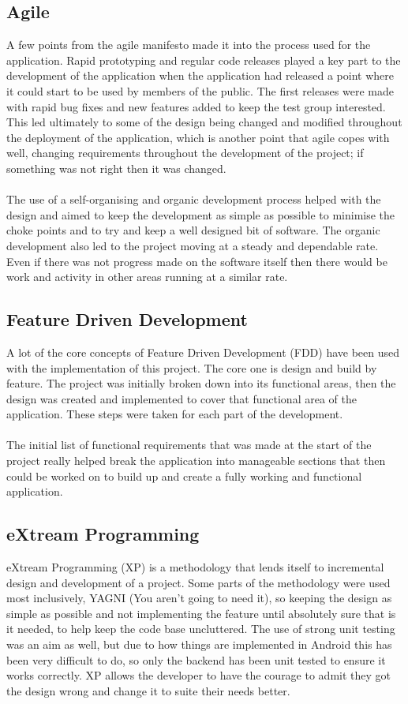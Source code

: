 \subsection{Agile}

A few points from the agile manifesto made it into the process used for the application. Rapid prototyping and regular code releases played a key part to the development of the application when the application had released a point where it could start to be used by members of the public. The first releases were made with rapid bug fixes and new features added to keep the test group interested. This led ultimately to some of the design being changed and modified throughout the deployment of the application, which is another point that agile copes with well, changing requirements throughout the development of the project; if something was not right then it was changed.\\
\\
The use of a self-organising and organic development process helped with the design and aimed to keep the development as simple as possible to minimise the choke points and to try and keep a well designed bit of software. The organic development also led to the project moving at a steady and dependable rate. Even if there was not progress made on the software itself then there would be work and activity in other areas running at a similar rate.

\subsection{Feature Driven Development}

A lot of the core concepts of Feature Driven Development (FDD) have been used with the implementation of this project. The core one is design and build by feature. The project was initially broken down into its functional areas, then the design was created and implemented to cover that functional area of the application. These steps were taken for each part of the development.\\
\\
The initial list of functional requirements that was made at the start of the project really helped break the application into manageable sections that then could be worked on to build up and create a fully working and functional application.

\subsection{eXtream Programming}

eXtream Programming (XP) is a methodology that lends itself to incremental design and development of a project. Some parts of the methodology were used most inclusively, YAGNI (You aren't going to need it), so keeping the design as simple as possible and not implementing the feature until absolutely sure that is it needed, to help keep the code base uncluttered. The use of strong unit testing was an aim as well, but due to how things are implemented in Android this has been very difficult to do, so only the backend has been unit tested to ensure it works correctly. XP allows the developer to have the courage to admit they got the design wrong and change it to suite their needs better.
